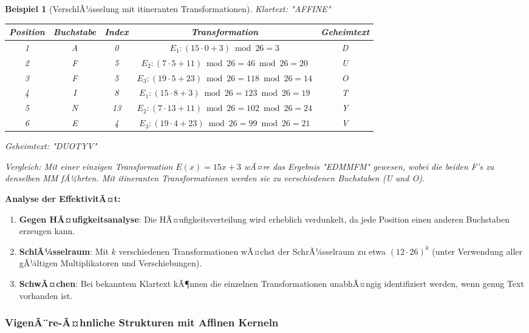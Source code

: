 ﻿\documentclass[12pt,a4paper]{article}
\newtheorem{example}{Beispiel}
\begin{document}
	\begin{example}[VerschlÃ¼sselung mit itineranten Transformationen]
		Klartext: "AFFINE"
		
		\begin{center}
			\small
			\begin{tabular}{|c|c|c|c|c|}
				\hline
				\textbf{Position} & \textbf{Buchstabe} & \textbf{Index} & \textbf{Transformation} & \textbf{Geheimtext} \\
				\hline
				1 & A & 0 & $E_1: (15 \cdot 0 + 3) \bmod 26 = 3$ & D \\
				2 & F & 5 & $E_2: (7 \cdot 5 + 11) \bmod 26 = 46 \bmod 26 = 20$ & U \\
				3 & F & 5 & $E_3: (19 \cdot 5 + 23) \bmod 26 = 118 \bmod 26 = 14$ & O \\
				4 & I & 8 & $E_1: (15 \cdot 8 + 3) \bmod 26 = 123 \bmod 26 = 19$ & T \\
				5 & N & 13 & $E_2: (7 \cdot 13 + 11) \bmod 26 = 102 \bmod 26 = 24$ & Y \\
				6 & E & 4 & $E_3: (19 \cdot 4 + 23) \bmod 26 = 99 \bmod 26 = 21$ & V \\
				\hline
			\end{tabular}
		\end{center}
		
		Geheimtext: "DUOTYV"
		
		Vergleich: Mit einer einzigen Transformation $E(x) = 15x + 3$ wÃ¤re das Ergebnis "EDMMFM" gewesen, wobei die beiden F's zu denselben MM fÃ¼hrten. Mit itineranten Transformationen werden sie zu verschiedenen Buchstaben (U und O).
	\end{example}
	
	\textbf{Analyse der EffektivitÃ¤t:}
	\begin{enumerate}
		\item \textbf{Gegen HÃ¤ufigkeitsanalyse}: Die HÃ¤ufigkeitsverteilung wird erheblich verdunkelt, da jede Position einen anderen Buchstaben erzeugen kann.
		\item \textbf{SchlÃ¼sselraum}: Mit $k$ verschiedenen Transformationen wÃ¤chst der SchrÃ¼sselraum zu etwa $(12 \cdot 26)^k$ (unter Verwendung aller gÃ¼ltigen Multiplikatoren und Verschiebungen).
		\item \textbf{SchwÃ¤chen}: Bei bekanntem Klartext kÃ¶nnen die einzelnen Transformationen unabhÃ¤ngig identifiziert werden, wenn genug Text vorhanden ist.
	\end{enumerate}
	
	\subsubsection{VigenÃ¨re-Ã¤hnliche Strukturen mit Affinen Kerneln}
	
\end{document}
